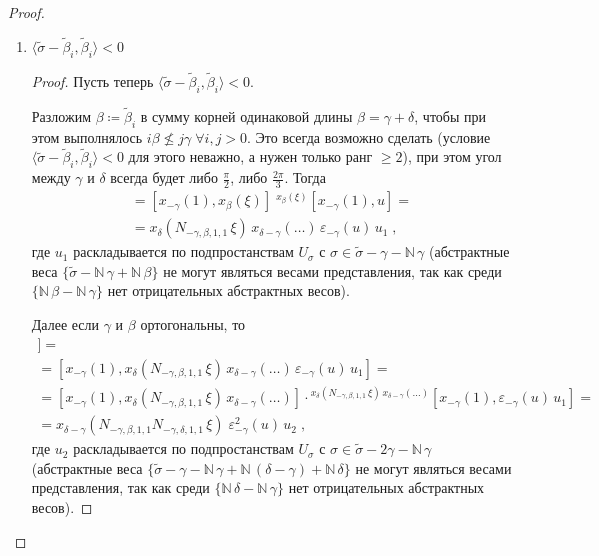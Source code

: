 \documentclass[10pt]{article}
\theoremstyle{remark}
\newcommand{\N}{\mathbb{N}}
\renewcommand{\ge}{\geqslant}
\begin{document}
\begin{proof}
\begin{enumerate}
\item $\langle\widetilde\sigma - \widetilde\beta_i, \widetilde\beta_i\rangle < 0$
\begin{proof}
Пусть теперь $\langle\widetilde\sigma - \widetilde\beta_i, \widetilde\beta_i\rangle < 0$.

Разложим $\beta \coloneqq \widetilde\beta_i$ в сумму корней одинаковой длины $\beta = \gamma + \delta$, чтобы при этом выполнялось $i\beta \nleq j\gamma \; \forall i,j>0$. Это всегда возможно сделать (условие $\langle\widetilde\sigma - \widetilde\beta_i, \widetilde\beta_i\rangle < 0$ для этого неважно, а нужен только ранг $\ge2$), при этом угол между $\gamma$ и $\delta$ всегда будет либо $\frac{\pi}{2}$, либо $\frac{2\pi}{3}$. Тогда
\begin{multline*}
[x_{-\gamma}(1),x_\beta(\xi) u] = [x_{-\gamma}(1),x_\beta(\xi)] \; {}^{x_\beta(\xi)}[x_{-\gamma}(1),u] = \\ =
x_\delta(N_{-\gamma,\beta,1,1} \,\xi) \, x_{\delta-\gamma}(\ldots) \, \varepsilon_{-\gamma}(u) \, u_1 \; ,
\end{multline*}
где $u_1$ раскладывается по подпростанствам $U_\sigma$ с $\sigma \in \widetilde\sigma-\gamma - \N \, \gamma$ (абстрактные веса $\{\widetilde\sigma-\N\,\gamma+\N\,\beta\}$ не могут являться весами представления, так как среди $\{\N\,\beta-\N\,\gamma\}$ нет отрицательных абстрактных весов).

Далее если $\gamma$ и $\beta$ ортогональны, то 
\begin{multline*}
[x_{-\gamma}(1), [x_{-\gamma}(1),x_\beta(\xi) u]] = \\ =
[x_{-\gamma}(1), x_\delta(N_{-\gamma,\beta,1,1} \,\xi) \, x_{\delta-\gamma}(\ldots) \, \varepsilon_{-\gamma}(u) \, u_1] = \\ =
[x_{-\gamma}(1), x_\delta(N_{-\gamma,\beta,1,1} \,\xi) \, x_{\delta-\gamma}(\ldots)] \cdot {}^{x_\delta(N_{-\gamma,\beta,1,1} \,\xi) \, x_{\delta-\gamma}(\ldots)} [x_{-\gamma}(1), \varepsilon_{-\gamma}(u) \, u_1] = \\ =
x_{\delta-\gamma}(N_{-\gamma,\beta,1,1} N_{-\gamma,\delta,1,1} \, \xi) \; \varepsilon^2_{-\gamma}(u) \, u_2 \; ,
\end{multline*}
где $u_2$ раскладывается по подпростанствам $U_\sigma$ с $\sigma \in \widetilde\sigma-2\gamma - \N \, \gamma$ (абстрактные веса $\{\widetilde\sigma-\gamma-\N\,\gamma+\N\,(\delta-\gamma) + \N\,\delta\}$ не могут являться весами представления, так как среди $\{\N\,\delta-\N\,\gamma\}$ нет отрицательных абстрактных весов).


\end{proof}
\end{enumerate}
\end{proof}
\end{document}
